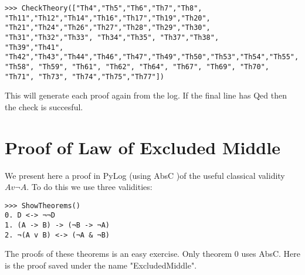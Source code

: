 \documentclass[a4paper,12pt,leqno]{article}
\numberwithin{equation}{section}
\begin{document}
\begin{verbatim}
>>> CheckTheory(["Th4","Th5","Th6","Th7","Th8",
"Th11","Th12","Th14","Th16","Th17","Th19","Th20",
"Th21","Th24","Th26","Th27","Th28","Th29","Th30",
"Th31","Th32","Th33", "Th34","Th35", "Th37","Th38",
"Th39","Th41", "Th42","Th43","Th44","Th46","Th47","Th49","Th50","Th53","Th54","Th55", "Th58", "Th59", "Th61", "Th62", "Th64", "Th67", "Th69", "Th70", "Th71", "Th73", "Th74","Th75","Th77"])
\end{verbatim}

This will generate each proof again from the log. If the final line has Qed then the check is succesful.

\section*{Proof of Law of Excluded Middle}

We present here a proof in PyLog (using AbsC )of the useful classical validity $A v \neg A$. To do this we use
three validities:

\begin{verbatim}
>>> ShowTheorems()
0. D <-> ¬¬D 
1. (A -> B) -> (¬B -> ¬A) 
2. ¬(A v B) <-> (¬A & ¬B) 
\end{verbatim}

The proofs of these theorems is an easy exercise. Only theorem 0 uses AbsC. Here is the proof saved under the name "ExcludedMiddle".
\end{document}
